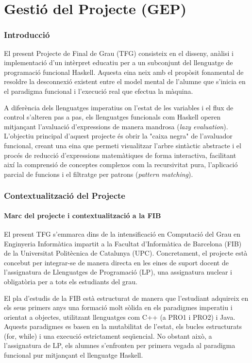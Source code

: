\part{Gestió del Projecte (GEP)}

\section{Introducció}

El present Projecte de Final de Grau (TFG) consisteix en el disseny, anàlisi i implementació d'un intèrpret educatiu per a un subconjunt del llenguatge de programació funcional Haskell. Aquesta eina neix amb el propòsit fonamental de resoldre la desconnexió existent entre el model mental de l'alumne que s'inicia en el paradigma funcional i l'execució real que efectua la màquina. 

A diferència dels llenguatges imperatius on l'estat de les variables i el flux de control s'alteren pas a pas, els llenguatges funcionals com Haskell operen mitjançant l'avaluació d'expressions de manera mandrosa (\textit{lazy evaluation}). L'objectiu principal d'aquest projecte és obrir la "caixa negra" de l'avaluador funcional, creant una eina que permeti visualitzar l'arbre sintàctic abstracte i el procés de reducció d'expressions matemàtiques de forma interactiva, facilitant així la comprensió de conceptes complexos com la recursivitat pura, l'aplicació parcial de funcions i el filtratge per patrons (\textit{pattern matching}).

\section{Contextualització del Projecte}

\subsection{Marc del projecte i contextualització a la FIB}
El present TFG s'emmarca dins de la intensificació en Computació del Grau en Enginyeria Informàtica impartit a la Facultat d'Informàtica de Barcelona (FIB) de la Universitat Politècnica de Catalunya (UPC). Concretament, el projecte està concebut per integrar-se de manera directa en les eines de suport docent de l'assignatura de Llenguatges de Programació (LP), una assignatura nuclear i obligatòria per a tots els estudiants del grau.

El pla d'estudis de la FIB està estructurat de manera que l'estudiant adquireix en els seus primers anys una formació molt sòlida en els paradigmes imperatiu i orientat a objectes, utilitzant llenguatges com C++ (a PRO1 i PRO2) i Java. Aquests paradigmes es basen en la mutabilitat de l'estat, els bucles estructurats (for, while) i una execució estrictament seqüencial. No obstant això, a l'assignatura de LP, els alumnes s'enfronten per primera vegada al paradigma funcional pur mitjançant el llenguatge Haskell.

